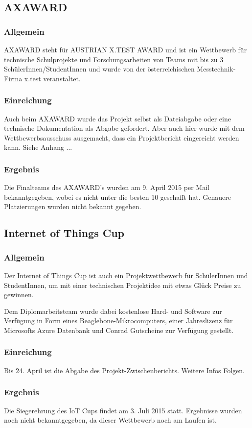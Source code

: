 \subsection{AXAWARD}
\subsubsection{Allgemein}
AXAWARD steht für AUSTRIAN X.TEST AWARD und ist ein Wettbewerb für technische Schulprojekte und Forschungsarbeiten
von Teams mit bis zu 3 SchülerInnen/StudentInnen und wurde von der österreichischen Messtechnik-Firma x.test veranstaltet.

\subsubsection{Einreichung}
Auch beim AXAWARD wurde das Projekt selbst als Dateiabgabe oder eine technische
Dokumentation als Abgabe gefordert. Aber auch hier wurde mit dem Wettbewerbsausschuss ausgemacht,
dass ein Projektbericht eingereicht werden kann. Siehe Anhang ...

\subsubsection{Ergebnis}
Die Finalteams des AXAWARD's wurden am 9. April 2015 per Mail bekanntgegeben, wobei es \sblit nicht
unter die besten 10 geschafft hat. Genauere Platzierungen wurden nicht bekannt gegeben.


\subsection{Internet of Things Cup}
\subsubsection{Allgemein}
Der Internet of Things Cup ist auch ein Projektwettbewerb für SchülerInnen und StudentInnen,
um mit einer technischen Projektidee mit etwas Glück Preise zu gewinnen.

Dem Diplomarbeitsteam wurde dabei kostenlose Hard- und Software zur Verfügung in Form eines
Beaglebone-Mikrocomputers, einer Jahreslizenz für Microsofts Azure Datenbank und Conrad Gutscheine
zur Verfügung gestellt.

\subsubsection{Einreichung}
Bis 24. April ist die Abgabe des Projekt-Zwischenberichts. Weitere Infos Folgen.

\subsubsection{Ergebnis}
Die Siegerehrung des IoT Cups findet am 3. Juli 2015 statt. Ergebnisse wurden noch nicht bekanntgegeben,
da dieser Wettbewerb noch am Laufen ist.
